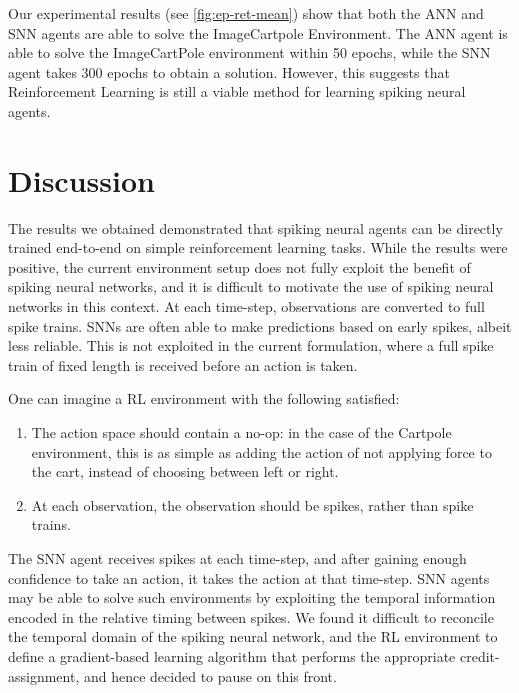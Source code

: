 \documentclass[fyp]{socreport}
\begin{document}
Our experimental results (see \autoref{fig:ep-ret-mean}) show that both the ANN
and SNN agents are able to solve the ImageCartpole Environment. The ANN agent is
able to solve the ImageCartPole environment within 50 epochs, while the SNN
agent takes 300 epochs to obtain a solution. However, this suggests that
Reinforcement Learning is still a viable method for learning spiking neural
agents.

\section{Discussion}

The results we obtained demonstrated that spiking neural agents can be directly
trained end-to-end on simple reinforcement learning tasks. While the results
were positive, the current environment setup does not fully exploit the benefit
of spiking neural networks, and it is difficult to motivate the use of spiking
neural networks in this context. At each time-step, observations are converted
to full spike trains. SNNs are often able to make predictions based on early
spikes, albeit less reliable. This is not exploited in the current formulation,
where a full spike train of fixed length is received before an action is taken.

One can imagine a RL environment with the following satisfied:

\begin{enumerate}
  \item The action space should contain a no-op: in the case of the Cartpole
    environment, this is as simple as adding the action of not applying force to
    the cart, instead of choosing between left or right.
  \item At each observation, the observation should be spikes, rather than spike
  trains.
\end{enumerate}

The SNN agent receives spikes at each time-step, and after gaining enough
confidence to take an action, it takes the action at that time-step. SNN agents
may be able to solve such environments by exploiting the temporal information
encoded in the relative timing between spikes. We found it difficult to
reconcile the temporal domain of the spiking neural network, and the RL
environment to define a gradient-based learning algorithm that performs the
appropriate credit-assignment, and hence decided to pause on this front.
\end{document}

